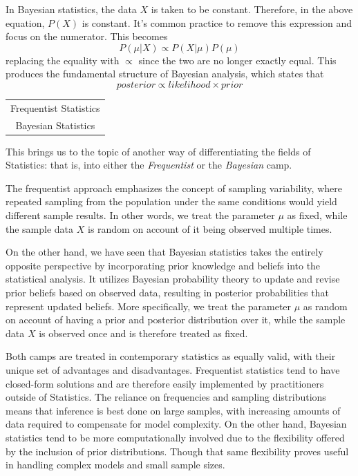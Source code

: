 \documentclass{article}
\begin{document}
In Bayesian statistics, the data $X$ is taken to be constant. Therefore, in the above equation, $P(X)$ is constant. It's common practice to remove this expression and focus on the numerator. This becomes
$$
P(\mu | X) \propto P(X|\mu)P(\mu)
$$
replacing the equality with $\propto$ since the two are no longer exactly equal. This produces the fundamental structure of Bayesian analysis, which states that
$$
posterior \propto likelihood \times prior
$$

\begin{margintable}
\begin{tabular}{c} 
    Frequentist Statistics \\
    Bayesian Statistics
\end{tabular}
\end{margintable}


This brings us to the topic of another way of differentiating the fields of Statistics: that is, into either the \emph{Frequentist} or the \emph{Bayesian} camp.

The frequentist approach emphasizes the concept of sampling variability, where repeated sampling from the population under the same conditions would yield different sample results. In other words, we treat the parameter $\mu$ as fixed, while the sample data $X$ is random on account of it being observed multiple times.

On the other hand, we have seen that Bayesian statistics takes the entirely opposite perspective by incorporating prior knowledge and beliefs into the statistical analysis. It utilizes Bayesian probability theory to update and revise prior beliefs based on observed data, resulting in posterior probabilities that represent updated beliefs. More specifically, we treat the parameter $\mu$ as random on account of having a prior and posterior distribution over it, while the sample data $X$ is observed once and is therefore treated as fixed.

Both camps are treated in contemporary statistics as equally valid, with their unique set of advantages and disadvantages. Frequentist statistics tend to have closed-form solutions and are therefore easily implemented by practitioners outside of Statistics. The reliance on frequencies and sampling distributions means that inference is best done on large samples, with increasing amounts of data required to compensate for model complexity. On the other hand, Bayesian statistics tend to be more computationally involved due to the flexibility offered by the inclusion of prior distributions. Though that same flexibility proves useful in handling complex models and small sample sizes.
\end{document}
